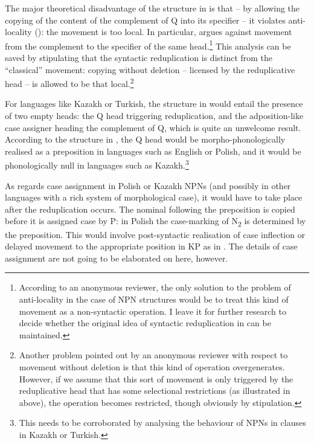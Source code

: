 \documentclass[output=paper]{langscibook}
\begin{document}
\noindent The major theoretical disadvantage of the structure in  is that – by allowing the copying of the content of the complement of Q into its specifier – it violates anti-locality (\citealt{Abels2003,grohmann2003prolific}): the movement is too local. In particular, \citet{Abels2003} argues against movement from the complement to the specifier of the same head.\footnote{According to an anonymous reviewer, the only solution to the problem of anti-locality in the case of NPN structures would be to treat this kind of movement as a non-syntactic operation. I leave it for further research to decide whether the original idea of syntactic reduplication in \citet{Travis2001,Travis2003} can be maintained.} This analysis can be saved by stipulating that the syntactic reduplication is distinct from the ``classical'' movement: copying without deletion – licensed by the reduplicative head – is allowed to be that local.\footnote{Another problem pointed out by an anonymous reviewer with respect to movement without deletion is that this kind of operation overgenerates. However, if we assume that this sort of movement is only triggered by the reduplicative head that has some selectional restrictions (as illustrated in  above), the operation becomes restricted, though obviously by stipulation.}

For languages like Kazakh or Turkish, the structure in  would entail the presence of two empty heads: the Q head triggering reduplication, and the adposition-like case assigner heading the complement of Q, which is quite an unwelcome result. According to the structure in , the Q head would be morpho-phonologically realised as a preposition in languages such as English or Polish, and it would be phonologically null in languages such as Kazakh.\footnote{This needs to be corroborated by analysing the behaviour of NPNs in clauses in Kazakh or Turkish.}

As regards case assignment in Polish or Kazakh NPNs (and possibly in other languages with a rich system of morphological case), it would have to take place after the reduplication occurs. The nominal following the preposition is copied before it is assigned case by P: in Polish the case-marking of N\textsubscript{2} is determined by the preposition. This would involve post-syntactic realisation of case inflection \citep{Sigurdsson2012} or delayed movement to the appropriate position in KP as in \citet{Caha2009}. The details of case assignment are not going to be elaborated on here, however.
\end{document}
